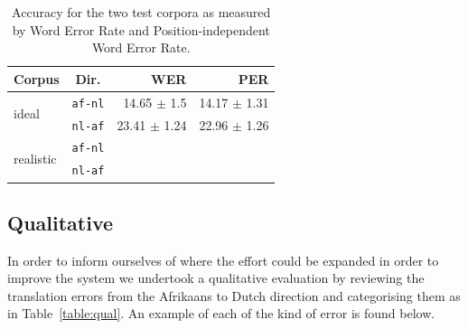 \documentclass[11pt]{article}
\begin{document}
\begin{table}
  \begin{center}
  \begin{tabular}{|l|c|r|r|}
   \hline
   {\bf Corpus}                & {\bf Dir.}  & {\bf WER}    & {\bf PER}\\
   \hline
   \multirow{2}{*}{ideal}      &  {\small {\tt af-nl}}      & 14.65 $\pm$ 1.5        &  14.17 $\pm$ 1.31 \\ 
                               &  {\small {\tt nl-af}}      & 23.41 $\pm$ 1.24     & 22.96 $\pm$ 1.26 \\
   \hline
   \multirow{2}{*}{realistic}  &  {\small {\tt af-nl}}      &              &  ~ \\ 
                               &  {\small {\tt nl-af}}      &              & ~ \\
   \hline
  \end{tabular}
    \caption{Accuracy for the two test corpora as measured by Word Error Rate 
        and Position-independent Word Error Rate.}
    \label{table:quan}
  \end{center}
\end{table}


\subsection{Qualitative}

In order to inform ourselves of where the effort could be expanded in order to improve the 
system we undertook a qualitative evaluation by reviewing the translation errors from the Afrikaans
to Dutch direction and categorising them as in Table~\ref{table:qual}. An example of each 
of the kind of error is found below.
\end{document}
